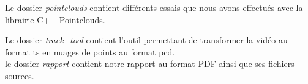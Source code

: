 \vspace{10pt}

Le dossier \textit{pointclouds} contient différents essais que nous avons effectués avec la librairie C++ Pointclouds. \\


\vspace{10pt}

Le dossier \textit{track\_tool} contient l'outil permettant de transformer la vidéo au format ts en nuages de points au format pcd.\\

le dossier \textit{rapport} contient notre rapport au format PDF ainsi que ses fichiers sources.\\

